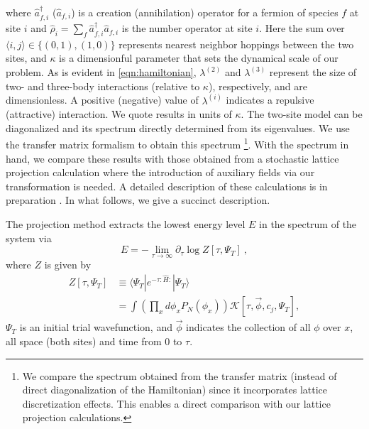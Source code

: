 \documentclass[aps,prl,twocolumn,showpacs,superscriptaddress,groupedaddress, final, nofootinbib]{revtex4}  %
\newcommand{\K}{\ensuremath{\mathcal{K}}}
\begin{document}
where $\hat a^\dag_{f,i}$ ($\hat a_{f,i}$) is a creation (annihilation) operator for a fermion of species $f$ at site $i$ and $\hat \rho_i=\sum_f \hat a^\dag_{f,i}\hat a_{f,i}$ is the number operator at site $i$.  Here the sum over $\langle i,j\rangle \in \{ (0,1), (1,0) \}$ represents nearest neighbor hoppings between the two sites, and $\kappa$ is a dimensionful parameter that sets the dynamical scale of our problem.  As is evident in \eqref{eqn:hamiltonian}, $\lambda^{(2)}$ and $\lambda^{(3)}$ represent the size of two- and three-body interactions (relative to $\kappa$), respectively, and are dimensionless.  A positive (negative) value of $\lambda^{(i)}$ indicates a repulsive (attractive) interaction.  We quote results in units of $\kappa$.   The two-site model can be diagonalized and its spectrum directly determined from its eigenvalues.  We use the transfer matrix formalism \cite{Lee:2008fa} to obtain this spectrum \footnote{We compare the spectrum obtained from the transfer matrix (instead of direct diagonalization of the Hamiltonian) since it incorporates lattice discretization effects.  This enables a direct comparison with our lattice projection calculations.}.  With the spectrum in hand, we compare these results with those obtained from a stochastic lattice projection calculation \cite{Lee:2008fa} where the introduction of auxiliary fields via our transformation is needed.  A detailed description of these calculations is in preparation \cite{our-long-paper}.   In what follows, we give a succinct description.

The projection method extracts the lowest energy level $E$ in the spectrum of the system via
\begin{equation}\label{eqn:E}
E=-\lim_{\tau\to\infty}{\partial_\tau \log Z[\tau,\Psi_T]} \ ,
\end{equation}
where $Z$ is given by
\begin{align}
Z[\tau,\Psi_T] &\equiv\langle \Psi_T| e^{-\tau :\hat H:}|\Psi_T\rangle      \nonumber\\
&= \int \left(\prod_{x} d\phi_x P_N(\phi_x)\right) \K[\tau,\vec{\phi},c_j,\Psi_T],                     \label{eqn:Z}
\end{align}
$\Psi_T$ is an initial trial wavefunction, and $\vec\phi$ indicates the collection of all $\phi$ over $x$, all space (both sites) and time from 0 to $\tau$.
\end{document}
